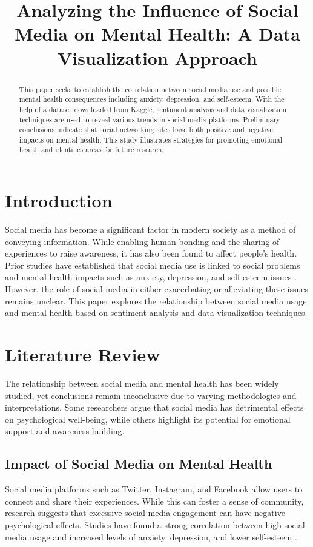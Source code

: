 \documentclass[twocolumn,numbers]{article}
\title{Analyzing the Influence of Social Media on Mental Health: A Data Visualization Approach}
\author{}
\date{}
\begin{document}
\maketitle

\begin{abstract}
This paper seeks to establish the correlation between social media use and possible mental health consequences including anxiety, depression, and self-esteem. With the help of a dataset downloaded from Kaggle, sentiment analysis and data visualization techniques are used to reveal various trends in social media platforms. Preliminary conclusions indicate that social networking sites have both positive and negative impacts on mental health. This study illustrates strategies for promoting emotional health and identifies areas for future research.
\end{abstract}

\section{Introduction}
Social media has become a significant factor in modern society as a method of conveying information. While enabling human bonding and the sharing of experiences to raise awareness, it has also been found to affect people's health. Prior studies have established that social media use is linked to social problems and mental health impacts such as anxiety, depression, and self-esteem issues \citep{davis2019}. However, the role of social media in either exacerbating or alleviating these issues remains unclear. This paper explores the relationship between social media usage and mental health based on sentiment analysis and data visualization techniques.

\section{Literature Review}
The relationship between social media and mental health has been widely studied, yet conclusions remain inconclusive due to varying methodologies and interpretations. Some researchers argue that social media has detrimental effects on psychological well-being, while others highlight its potential for emotional support and awareness-building.

\subsection{Impact of Social Media on Mental Health}
Social media platforms such as Twitter, Instagram, and Facebook allow users to connect and share their experiences. While this can foster a sense of community, research suggests that excessive social media engagement can have negative psychological effects. Studies have found a strong correlation between high social media usage and increased levels of anxiety, depression, and lower self-esteem \citep{brown2021}. 
\end{document}
